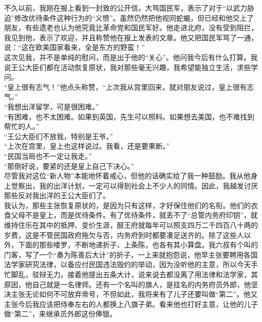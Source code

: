 不久以前，我刚在报上看到一封致的公开信，大骂国民军，表示了对于“以武力胁迫”修改优待条件这种行为的“义愤”。虽然仍然把他视同蛇蝎，但已经和他交上了朋友，有些遗老也认为他究竟比革命党和国民军好。他走进北府，没有受到阻拦，我见到他，表示了欢迎，并且称赞他在报上发表的文章。他又把国民军骂了一通，说：“这在欧美国家看来，全是东方的野蛮！”\\

这次见我，并不是单纯的慰问，而是出于他的“关心”。他问我今后有什么打算。我说王公大臣们都在活动恢复原状，我对那些毫无兴趣，我希望能独立生活，求些学问。\\

“皇上很有志气！”他点头称赞，“上次我从宫里回来，就对朋友说过，皇上很有志气。”\\

“我想出洋留学，可是很困难。”\\

“有困难，也不太困难。如果到英国，先生可以照料。如果想去美国，也不难找到帮忙的人。”\\

“王公大臣们不放我，特别是王爷。”\\

“上次在宫里，皇上也这样说过。我看，还是要果断。”\\

“民国当局也不一定让我走。”\\

“那倒好说，要紧的还是皇上自己下决心。”\\

尽管我对这位“新人物”本能地怀着戒心，但他的话确实给了我一种鼓励。我从他身上觉察出，我的出洋计划，一定可以得到社会上不少人的同情。因此，我越发讨厌那些反对我出洋的王公大臣们了。\\

我认为，那些主张恢复原状的，是因为只有这样，才好保住他们的名衔。他们的衣食父母不是皇上，而是优待条件。有了优待条件，就丢不了“总管内务府印钥”，就维持住乐在其中的抵押、变价生涯，醇王府就每年可以照支四万二千四百八十两的岁费，这是不管民国政府拖欠与否，内务府到时都要凑足送齐的。除了这些人以外，下面的那些喽罗，不断地递折子、上条陈，也各有其小算盘。我六叔有个叫的门客，写了一个“奏为陈善后大计”的折子，一上来就抱怨说，他早主张要聘用各国法学家研究法律，以备应付民国违法毁约的举动，因为没听他的主意，所以今天手忙脚乱，驳辩无力。接着他提出五条大计，说来说去都没离了用法律和法学家，其原因，他自己就是一名律师。还有一个名叫的旗人，是挂名的内务府员外郎，他坚决主张无论如何不可放弃帝号，不但如此，我将来有了儿子还要叫做“第二”。他又主张今后我应该把侍奉左右的人都换上八旗子弟。看来他也打好主意，让他的儿子做“第二”，来继承员外郎这份俸银。\\

